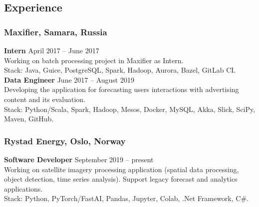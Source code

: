 \subsection*{Experience}
    \subsubsection*{Maxifier, Samara, Russia}
    \textbf{Intern} \hfill April 2017 -- June 2017\\
    Working on batch processing project in Maxifier as Intern. \\
    Stack: Java, Guice, PostgreSQL, Spark, Hadoop, Aurora, Bazel, GitLab CI. \\
    \textbf{Data Engineer} \hfill June 2017 -- August 2019\\
    Developing the application for forecasting users interactions with advertising content and its evaluation. \\
    Stack: Python/Scala, Spark, Hadoop, Mesos, Docker, MySQL, Akka, Slick, SciPy, Maven, GitHub.
    \subsubsection*{Rystad Energy, Oslo, Norway}
    \textbf{Software Developer} \hfill September 2019 -- present\\
    Working on satellite imagery processing application (spatial data processing, object detection, time series analysis).
    Support legacy forecast and analytics applications. \\
    Stack: Python, PyTorch/FastAI, Pandas, Jupyter, Colab, .Net Framework, C\#.